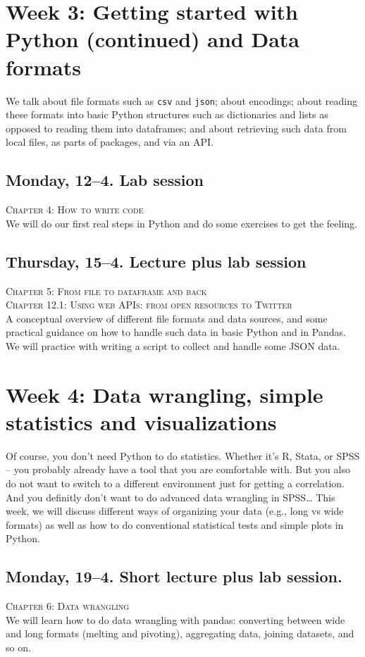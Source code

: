 \section*{Week 3: Getting started with Python (continued)  and Data formats}

We talk about file formats such as \texttt{csv} and \texttt{json}; about encodings; about reading these formats into basic Python structures such as dictionaries and lists as opposed to reading them into dataframes; and about retrieving such data from local files, as parts of packages, and via an API.

\subsection*{Monday, 12--4. Lab session}
\textsc{ Chapter 4: How to write code}\\
We will do our first real steps in Python and do some exercises to get the feeling.\\ 

\subsection*{Thursday, 15--4. Lecture plus lab session}
\textsc{ Chapter 5: From file to dataframe and back}\\
\textsc{ Chapter 12.1: Using web APIs: from open resources to Twitter}\\
A conceptual overview of different file formats and data sources, and some practical guidance on how to handle such data in basic Python and in Pandas. We will practice with writing a script to collect and handle some JSON data.


\section*{Week 4: Data wrangling, simple statistics and visualizations}

Of course, you don't need Python to do statistics. Whether it's R, Stata, or SPSS -- you probably already have a tool that you are comfortable with. But you also do not want to switch to a different environment just for getting a correlation. And you definitly don't want to do advanced data wrangling in SPSS\ldots
This week, we will discuss different ways of organizing your data (e.g., long vs wide formats) as well as how to do conventional statistical tests and simple plots in Python.

\subsection*{Monday, 19--4. Short lecture plus lab session.}
\textsc{ Chapter 6: Data wrangling}\\
We will learn how to do data wrangling with pandas: converting between wide and long formats (melting and pivoting), aggregating data, joining datasets, and so on.

